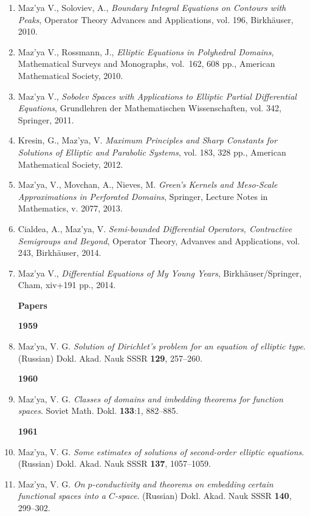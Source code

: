 \documentclass{article}
\begin{document}
\begin{enumerate}
\item Maz'ya V.,  Soloviev, A., {\it Boundary Integral Equations on Contours with Peaks}, Operator Theory Advances and Applications, vol. 196, Birkh\"auser, 2010.

\item Maz'ya V., Rossmann, J., {\it Elliptic Equations in Polyhedral Domains},      Mathematical Surveys and
       Monographs, vol.~162, 608 pp., American Mathematical Society,
2010.

\item Maz'ya V., {\it Sobolev Spaces with Applications to Elliptic Partial Differential Equations}, Grundlehren der Mathematischen Wissenschaften, vol. 342, Springer, 2011.

\item Kresin, G., Maz'ya, V. {\it Maximum Principles and Sharp Constants for Solutions of Elliptic and Parabolic Systems}, vol. 183, 328 pp., American Mathematical Society,
2012.

\item  Maz'ya, V.,  Movchan, A.,   Nieves, M.
{\it Green's Kernels and Meso-Scale Approximations in Perforated Domains}, Springer, Lecture Notes in Mathematics,  v. 2077, 2013.

\item Cialdea, A., Maz'ya, V. {\it Semi-bounded Differential Operators, Contractive Semigroups and Beyond}, Operator Theory, Advanves and Applications, vol. 243, Birkh\"auser, 2014.

\item Maz'ya V., {\it Differential Equations of My Young Years},
  Birkh\"auser/Springer, Cham,  xiv+191 pp., 2014.

\vfill\eject
\textbf{\Large Papers}

\vspace{1em}
{\bf 1959}
\item Maz'ya, V. G. {\it Solution of Dirichlet's problem for an
equation
of elliptic type}. (Russian) Dokl. Akad.
Nauk SSSR {\bf 129}, 257--260.\hfill\break

{\bf 1960}
\item Maz'ya, V. G. {\it Classes of domains and imbedding theorems for
function spaces}. Soviet Math. Dokl. {\bf 133}:1,
882--885.\hfill\break

{\bf 1961}
\item Maz'ya, V. G. {\it Some estimates of solutions of second-order
elliptic equations}. (Russian) Dokl. Akad. Nauk
SSSR {\bf 137}, 1057--1059.
\item Maz'ya, V. G. {\it On $p$-conductivity and theorems on embedding
certain functional spaces into a $C$-space}.
(Russian) Dokl. Akad. Nauk SSSR {\bf 140}, 299--302.\hfill\break


\end{enumerate}
\end{document}
